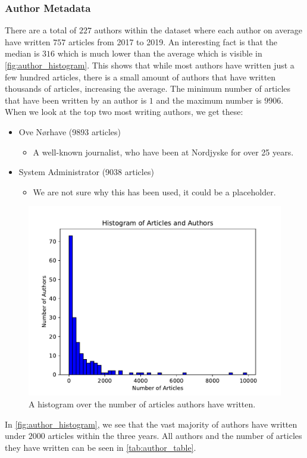 \subsubsection{Author Metadata}
There are a total of $227$ authors within the dataset where each author on average have written $757$ articles from 2017 to 2019.
An interesting fact is that the median is $316$ which is much lower than the average which is visible in \autoref{fig:author_histogram}.
This shows that while most authors have written just a few hundred articles, there is a small amount of authors that have written thousands of articles, increasing the average.
The minimum number of articles that have been written by an author is $1$ and the maximum number is $9906$.
When we look at the top two most writing authors, we get these:
\begin{itemize}
	\item Ove Nørhave (9893 articles)
	\begin{itemize}
		\item A well-known journalist, who have been at Nordjyske for over 25 years.
	\end{itemize}
	\item System Administrator (9038 articles)
	\begin{itemize}
		\item We are not sure why this has been used, it could be a placeholder.
	\end{itemize}
\end{itemize}

 
\begin{figure}
	\centering
	\includegraphics[width=.7\linewidth]{figures/author_hist_plot.pdf}
	\caption{A histogram over the number of articles authors have written.}
	\label{fig:author_histogram}
\end{figure}
In \autoref{fig:author_histogram}, we see that the vast majority of authors have written under $2000$ articles within the three years. 
All authors and the number of articles they have written can be seen in \autoref{tab:author_table}.

